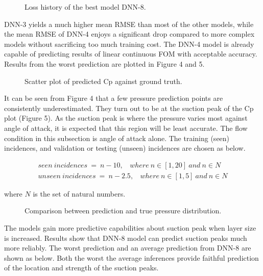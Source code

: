 \documentclass[11pt]{article}
\begin{document}
\begin{figure}[htbp]
    \centering
    
    \caption{Loss history of the best model DNN-8.}
\end{figure}

DNN-3 yields a much higher mean RMSE than most of the other models, while the mean RMSE of DNN-4 enjoys a significant drop compared to more complex models without sacrificing too much training cost. The DNN-4 model is already capable of predicting results of linear continuous FOM with acceptable accuracy. Results from the worst prediction are plotted in Figure 4 and 5.

\begin{figure}[H]
    \centering
    
    \caption{Scatter plot of predicted Cp against ground truth.}
\end{figure}

It can be seen from Figure 4 that a few pressure prediction points are consistently underestimated. They turn out to be at the suction peak of the Cp plot (Figure 5). As the suction peak is where the pressure varies most against angle of attack, it is expected that this region will be least accurate. The flow condition in this subsection is angle of attack alone. The training (seen) incidences, and validation or testing (unseen) incidences are chosen as below.

\begin{equation}
	\label{eqn:Example}
	\begin{split}
        seen~incidences~=~n-10,~~~~where~n\in[1,20]~and~n\in N \\
		unseen~incidences~=~n-2.5,~~~~where~n\in[1,5]~and~n\in N
	\end{split}
\end{equation}

where $N$ is the set of natural numbers.

\begin{figure}[htbp]
    \centering
    
    \caption{Comparison between prediction and true pressure distribution.}
\end{figure}

The models gain more predictive capabilities about suction peak when layer size is increased. Results show that DNN-8 model can predict suction peaks much more reliably. The worst prediction and an average prediction from DNN-8 are shown as below. Both the worst the average inferences provide faithful prediction of the location and strength of the suction peaks.    \\
\\
\\
\end{document}
